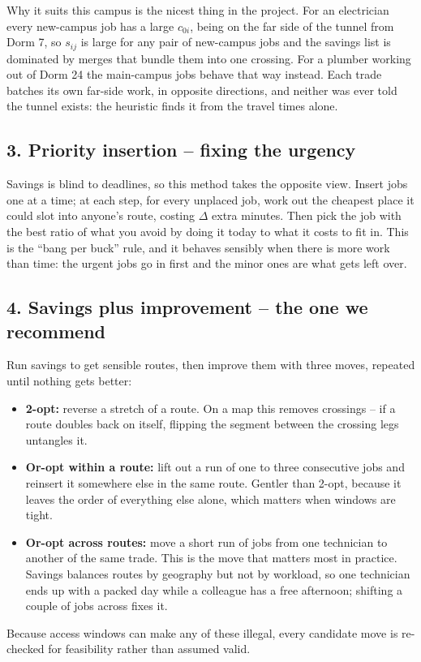 \documentclass[11pt]{article}
\begin{document}
Why it suits this campus is the nicest thing in the project. For an
electrician every new-campus job has a large $c_{0i}$, being on the far side
of the tunnel from Dorm 7, so $s_{ij}$ is large for any pair of new-campus
jobs and the savings list is dominated by merges that bundle them into one
crossing. For a plumber working out of Dorm 24 the main-campus jobs behave
that way instead. Each trade batches its own far-side work, in opposite
directions, and neither was ever told the tunnel exists: the heuristic finds
it from the travel times alone.

\subsection{3. Priority insertion -- fixing the urgency}
Savings is blind to deadlines, so this method takes the opposite view. Insert
jobs one at a time; at each step, for every unplaced job, work out the
cheapest place it could slot into anyone's route, costing $\Delta$ extra
minutes. Then pick the job with the best ratio of what you avoid by doing it
today to what it costs to fit in. This is the ``bang per buck'' rule, and it
behaves sensibly when there is more work than time: the urgent jobs go in
first and the minor ones are what gets left over.

\subsection{4. Savings plus improvement -- the one we recommend}
Run savings to get sensible routes, then improve them with three moves,
repeated until nothing gets better:
\begin{itemize}
\item \textbf{2-opt:} reverse a stretch of a route. On a map this removes
  crossings -- if a route doubles back on itself, flipping the segment
  between the crossing legs untangles it.
\item \textbf{Or-opt within a route:} lift out a run of one to three
  consecutive jobs and reinsert it somewhere else in the same route. Gentler
  than 2-opt, because it leaves the order of everything else alone, which
  matters when windows are tight.
\item \textbf{Or-opt across routes:} move a short run of jobs from one
  technician to another of the same trade. This is the move that matters most
  in practice. Savings balances routes by geography but not by workload, so
  one technician ends up with a packed day while a colleague has a free
  afternoon; shifting a couple of jobs across fixes it.
\end{itemize}
Because access windows can make any of these illegal, every candidate move is
re-checked for feasibility rather than assumed valid.
\end{document}
